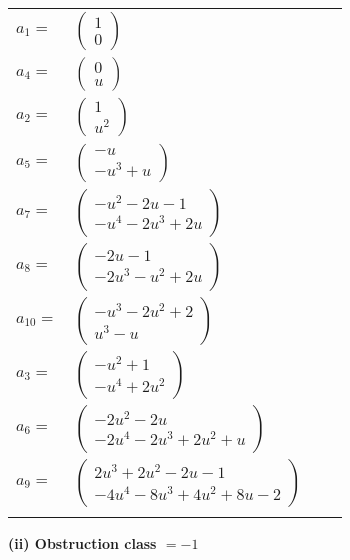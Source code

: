 \documentclass[1p]{elsarticle_modified}
\theoremstyle{definition}
\begin{document}
\begin{tabular}{m{7pt} m{180pt} m{7pt} m{180pt} }
\flushright $a_{1}=$&$\begin{pmatrix}1\\0\end{pmatrix}$ \\
\flushright $a_{4}=$&$\begin{pmatrix}0\\u\end{pmatrix}$ \\
\flushright $a_{2}=$&$\begin{pmatrix}1\\u^2\end{pmatrix}$ \\
\flushright $a_{5}=$&$\begin{pmatrix}- u\\- u^3+u\end{pmatrix}$ \\
\flushright $a_{7}=$&$\begin{pmatrix}- u^2-2 u-1\\- u^4-2 u^3+2 u\end{pmatrix}$ \\
\flushright $a_{8}=$&$\begin{pmatrix}-2 u-1\\-2 u^3- u^2+2 u\end{pmatrix}$ \\
\flushright $a_{10}=$&$\begin{pmatrix}- u^3-2 u^2+2\\u^3- u\end{pmatrix}$ \\
\flushright $a_{3}=$&$\begin{pmatrix}- u^2+1\\- u^4+2 u^2\end{pmatrix}$ \\
\flushright $a_{6}=$&$\begin{pmatrix}-2 u^2-2 u\\-2 u^4-2 u^3+2 u^2+u\end{pmatrix}$ \\
\flushright $a_{9}=$&$\begin{pmatrix}2 u^3+2 u^2-2 u-1\\-4 u^4-8 u^3+4 u^2+8 u-2\end{pmatrix}$\\&\end{tabular}
\flushleft \textbf{(ii) Obstruction class $= -1$}\\~\\
\end{document}

